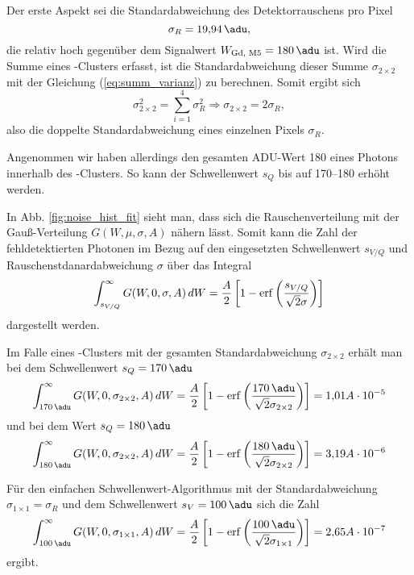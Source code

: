 \noindent
Der erste Aspekt sei die Standardabweichung des Detektorrauschens pro Pixel
\begin{equation}
    \sigma_R = \SI{19.94}{\adu},
\end{equation}
die relativ hoch gegenüber dem Signalwert $W_\text{Gd, M5} = \SI{180}{\adu}$ ist. Wird die Summe eines -Clusters erfasst, ist die Standardabweichung dieser Summe $\sigma_{2\times 2}$ mit der Gleichung (\ref{eq:summ_varianz}) zu berechnen. Somit ergibt sich
\begin{equation}
    \sigma_{2\times 2}^2 = \sum_{i=1}^4\sigma_R^2 \Rightarrow \sigma_{2\times 2} = 2\sigma_R,
\end{equation}
also die doppelte Standardabweichung eines einzelnen Pixels $\sigma_R$.

\noindent
Angenommen wir haben allerdings den gesamten ADU-Wert \SI{180}{\adu} eines Photons innerhalb des -Clusters. So kann der Schwellenwert $s_Q$ bis auf \qtyrange{170}{180}{\adu} erhöht werden.

\noindent
In Abb. \ref{fig:noise_hist_fit} sieht man, dass sich die Rauschenverteilung mit der Gauß-Verteilung $G(W, \mu, \sigma, A)$ nähern lässt. Somit kann die Zahl der fehldetektierten Photonen im Bezug auf den eingesetzten Schwellenwert $s_{V/Q}$ und Rauschenstdanardabweichung $\sigma$ über das Integral 
\begin{equation}
    \int_{s_{V/Q}}^\infty G(W, 0, \sigma, A) \,dW = \frac{A}{2}\left[1 - \operatorname{erf}\left({\frac{s_{V/Q}}{\sqrt{2}\sigma}}\right)\right]
\end{equation}
\noindent
dargestellt werden.

\noindent
Im Falle eines -Clusters mit der gesamten Standardabweichung $\sigma_{2\times 2}$ erhält man bei dem Schwellenwert $s_Q = \SI{170}{\adu}$
\begin{equation}
    \int_{\SI{170}{\adu}}^\infty G(W, 0, \sigma_{2\times 2}, A) \,dW = \frac{A}{2}\left[1 - \erf\left({\frac{\SI{170}{\adu}}{\sqrt{2}\sigma_{2\times 2}}}\right)\right] = 1{,}01A\cdot 10^{-5}
\end{equation}
\noindent
und bei dem Wert $s_Q = \SI{180}{\adu}$
\begin{equation}
    \int_{\SI{180}{\adu}}^\infty G(W, 0, \sigma_{2\times 2}, A) \,dW = \frac{A}{2}\left[1 - \erf\left({\frac{\SI{180}{\adu}}{\sqrt{2}\sigma_{2\times 2}}}\right)\right] = 3{,}19A\cdot 10^{-6}
\end{equation}

\noindent
Für den einfachen Schwellenwert-Algorithmus mit der Standardabweichung $\sigma_{1\times 1} = \sigma_{R}$ und dem Schwellenwert $s_V = \SI{100}{\adu}$ sich die Zahl
\begin{equation}
    \int_{\SI{100}{\adu}}^\infty G(W, 0, \sigma_{1\times 1}, A) \,dW = \frac{A}{2}\left[1 - \erf\left({\frac{\SI{100}{\adu}}{\sqrt{2}\sigma_{1\times 1}}}\right)\right] = 2{,}65A\cdot 10^{-7}
\end{equation}
ergibt.

